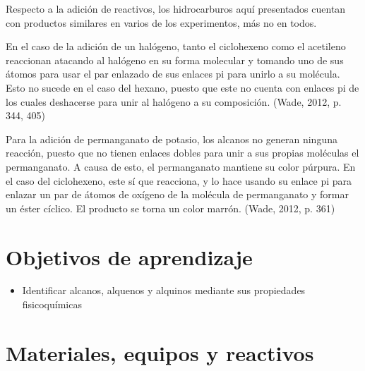 Respecto a la adición de reactivos, los hidrocarburos aquí presentados cuentan con productos similares en varios de los experimentos, más no en todos.

En el caso de la adición de un halógeno, tanto el ciclohexeno como el acetileno reaccionan atacando al halógeno en su forma molecular y tomando uno de sus átomos para usar el par enlazado de sus enlaces pi para unirlo a su molécula. Esto no sucede en el caso del hexano, puesto que este no cuenta con enlaces pi de los cuales deshacerse para unir al halógeno a su composición. (Wade, 2012, p. 344, 405)

Para la adición de permanganato de potasio, los alcanos no generan ninguna reacción, puesto que no tienen enlaces dobles para unir a sus propias moléculas el permanganato. A causa de esto, el permanganato mantiene su color púrpura. En el caso del ciclohexeno, este sí que reacciona, y lo hace usando su enlace pi para enlazar un par de átomos de oxígeno de la molécula de permanganato y formar un éster cíclico. El producto se torna un color marrón. (Wade, 2012, p. 361)


\section{Objetivos de aprendizaje}

\begin{itemize}
    \item Identificar alcanos, alquenos y alquinos mediante sus propiedades fisicoquímicas
\end{itemize}

\section{Materiales, equipos y reactivos}

